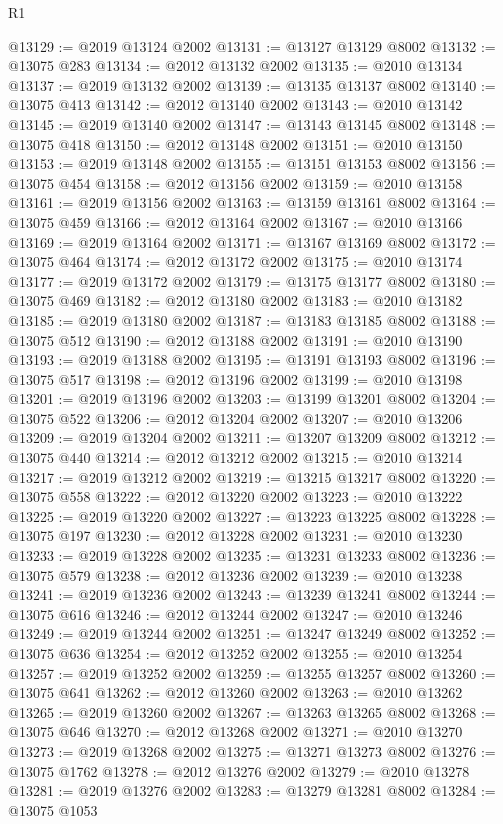 \begin{lexlean}{R1}
\begin{coremodule}
@13129 := @2019 @13124 @2002
@13131 := @13127 @13129 @8002
@13132 := @13075 @283
@13134 := @2012 @13132 @2002
@13135 := @2010 @13134
@13137 := @2019 @13132 @2002
@13139 := @13135 @13137 @8002
@13140 := @13075 @413
@13142 := @2012 @13140 @2002
@13143 := @2010 @13142
@13145 := @2019 @13140 @2002
@13147 := @13143 @13145 @8002
@13148 := @13075 @418
@13150 := @2012 @13148 @2002
@13151 := @2010 @13150
@13153 := @2019 @13148 @2002
@13155 := @13151 @13153 @8002
@13156 := @13075 @454
@13158 := @2012 @13156 @2002
@13159 := @2010 @13158
@13161 := @2019 @13156 @2002
@13163 := @13159 @13161 @8002
@13164 := @13075 @459
@13166 := @2012 @13164 @2002
@13167 := @2010 @13166
@13169 := @2019 @13164 @2002
@13171 := @13167 @13169 @8002
@13172 := @13075 @464
@13174 := @2012 @13172 @2002
@13175 := @2010 @13174
@13177 := @2019 @13172 @2002
@13179 := @13175 @13177 @8002
@13180 := @13075 @469
@13182 := @2012 @13180 @2002
@13183 := @2010 @13182
@13185 := @2019 @13180 @2002
@13187 := @13183 @13185 @8002
@13188 := @13075 @512
@13190 := @2012 @13188 @2002
@13191 := @2010 @13190
@13193 := @2019 @13188 @2002
@13195 := @13191 @13193 @8002
@13196 := @13075 @517
@13198 := @2012 @13196 @2002
@13199 := @2010 @13198
@13201 := @2019 @13196 @2002
@13203 := @13199 @13201 @8002
@13204 := @13075 @522
@13206 := @2012 @13204 @2002
@13207 := @2010 @13206
@13209 := @2019 @13204 @2002
@13211 := @13207 @13209 @8002
@13212 := @13075 @440
@13214 := @2012 @13212 @2002
@13215 := @2010 @13214
@13217 := @2019 @13212 @2002
@13219 := @13215 @13217 @8002
@13220 := @13075 @558
@13222 := @2012 @13220 @2002
@13223 := @2010 @13222
@13225 := @2019 @13220 @2002
@13227 := @13223 @13225 @8002
@13228 := @13075 @197
@13230 := @2012 @13228 @2002
@13231 := @2010 @13230
@13233 := @2019 @13228 @2002
@13235 := @13231 @13233 @8002
@13236 := @13075 @579
@13238 := @2012 @13236 @2002
@13239 := @2010 @13238
@13241 := @2019 @13236 @2002
@13243 := @13239 @13241 @8002
@13244 := @13075 @616
@13246 := @2012 @13244 @2002
@13247 := @2010 @13246
@13249 := @2019 @13244 @2002
@13251 := @13247 @13249 @8002
@13252 := @13075 @636
@13254 := @2012 @13252 @2002
@13255 := @2010 @13254
@13257 := @2019 @13252 @2002
@13259 := @13255 @13257 @8002
@13260 := @13075 @641
@13262 := @2012 @13260 @2002
@13263 := @2010 @13262
@13265 := @2019 @13260 @2002
@13267 := @13263 @13265 @8002
@13268 := @13075 @646
@13270 := @2012 @13268 @2002
@13271 := @2010 @13270
@13273 := @2019 @13268 @2002
@13275 := @13271 @13273 @8002
@13276 := @13075 @1762
@13278 := @2012 @13276 @2002
@13279 := @2010 @13278
@13281 := @2019 @13276 @2002
@13283 := @13279 @13281 @8002
@13284 := @13075 @1053

\end{coremodule}
\end{lexlean}
